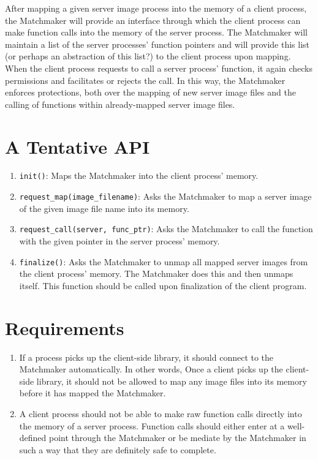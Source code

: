 \documentclass{article}
\begin{document}
After mapping a given server image process into the memory of a client process,
the Matchmaker will provide an interface through which the client process can
make function calls into the memory of the server process. The Matchmaker will
maintain a list of the server processes' function pointers and will provide
this list (or perhaps an abstraction of this list?) to the client process upon
mapping. When the client process requests to call a server process' function,
it again checks permissions and facilitates or rejects the call. In this way,
the Matchmaker enforces protections, both over the mapping of new server image
files and the calling of functions within already-mapped server image files.

\newpage
\section{A Tentative API}
\begin{enumerate}[(1)]
    \item \verb|init()|: Maps the Matchmaker into the client process' memory.
    \item \verb|request_map(image_filename)|: Asks the Matchmaker to map a server image of
        the given image file name into its memory.
    \item \verb|request_call(server, func_ptr)|: Asks the Matchmaker to call the function with
        the given pointer in the server process' memory.
    \item \verb|finalize()|: Asks the Matchmaker to unmap all mapped server images from the
        client process' memory. The Matchmaker does this and then unmaps itself. This function
        should be called upon finalization of the client program.
\end{enumerate}


\section{Requirements}
\begin{enumerate}[(1)]
    \item If a process picks up the client-side library, it should connect to the
    Matchmaker automatically. In other words, Once a client picks up the
    client-side library, it should not be allowed to map any image files into
    its memory before it has mapped the Matchmaker.
    \item A client process should not be able to make raw function calls directly
    into the memory of a server process. Function calls should either enter at a
    well-defined point through the Matchmaker or be mediate by the Matchmaker in
    such a way that they are definitely safe to complete.
\end{enumerate}
\end{document}
